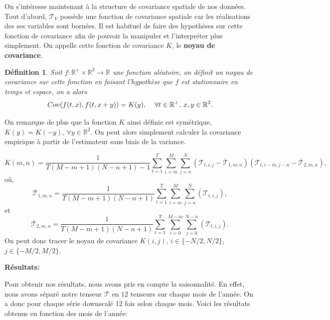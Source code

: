 \documentclass[a4paper,11pt]{article}
\numberwithin{equation}{section}
\newtheorem{definition}{Définition}
\begin{document}
\vspace{0.7cm}

On s'intéresse maintenant à la structure de covariance spatiale de nos données. Tout d'abord, $\mathcal{T}_{V}$ possède une fonction de covariance spatiale car les réalisations des ses variables sont bornées. Il est habituel de faire des hypothèses sur cette fonction de covariance afin de pouvoir la manipuler et l'interpréter plus simplement. On appelle cette fonction de covariance $K$, le \textbf{noyau de covariance}.

\begin{definition}
	Soit $f:\mathbb{R}^{+}\times\mathbb{R}^2\to \mathbb{R}$ une fonction aléatoire, on définit un noyau de covariance sur cette fonction en faisant l'hypothèse que $f$ est stationnaire en temps et espace, on a alors
	\[Cov(f(t,x),f(t,x+y))=K(y), \hspace{4mm} \forall t \in \mathbb{R}^{+},\,x,y \in \mathbb{R}^2. \] 
\end{definition}

On remarque de plus que la fonction $K$ ainsi définie est symétrique, $K(y)=K(-y),\, \forall y \in \mathbb{R}^2$. On peut alors simplement calculer la covariance empirique à partir de l'estimateur sans biais de la variance.

\[K(m,n)=\frac{1}{T(M-m+1)(N-n+1)-1}\sum_{t=1}^{T}\sum_{i=m}^{M}\sum_{j=n}^{N}(\mathcal{T}_{t,i,j}-\overline{\mathcal{T}}_{1,m,n})(\mathcal{T}_{t,i-m,j-n}-\overline{\mathcal{T}}_{2,m,n}),\]
où,
\[\overline{\mathcal{T}}_{1,m,n}=\frac{1}{T(M-m+1)(N-n+1)}\sum_{t=1}^{T}\sum_{i=m}^{M}\sum_{j=n}^{N}(\mathcal{T}_{t,i,j}),\]
et 
\[\overline{\mathcal{T}}_{2,m,n}=\frac{1}{T(M-m+1)(N-n+1)}\sum_{t=1}^{T}\sum_{i=0}^{M-m}\sum_{j=0}^{N-n}(\mathcal{T}_{t,i,j}).\]
On peut donc tracer le noyau de covariance $K(i,j)$, $i \in\{-N/2,N/2\}$, $j \in \{-M/2,M/2\}$. 

\vspace{0.7cm}

\noindent \textbf{Résultats:}

Pour obtenir nos résultats, nous avons pris en compte la saisonnalité. En effet, nous avons séparé notre tenseur $\mathcal{T}$ en $12$ tenseurs sur chaque mois de l'année. On a donc pour chaque série downscalé 12 fois selon chaque mois. Voici les résultats obtenus en fonction des mois de l'année:
\end{document}
